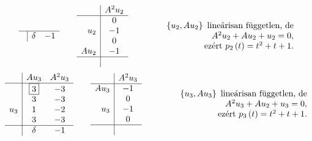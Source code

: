 \documentclass[9pt, a4paper, showtrims]{memoir}
\makeatletter
\renewenvironment{proof}[1][\proofname]
    {\par\pushQED{\qed}%
    \normalfont \topsep6\p@\@plus6\p@\relax
    \trivlist
    \item[\hskip\labelsep
        \itshape
    #1\@addpunct{:}]\ignorespaces}
    {\popQED\endtrivlist\@endpefalse}
\theoremstyle{plain}
\theoremstyle{remark}
\theoremstyle{definition}
\makeatother
\begin{document}
\begin{proof}[Megoldás]
\[\begin{array}{r|cc}
                \hline
                &\delta&-1
            \end{array}
            \qquad
            \begin{array}{r|c}
                &A^2u_2\\
                \hline
                & 0\\
                u_2&-1\\
                & 0\\
                Au_2&-1\\
                \hline
                & 
            \end{array}
            \qquad\qquad
            \begin{array}{r}
                \left\{ u_2,Au_2 \right\}\mbox{ lineárisan független, de}\\
                A^2u_2+Au_2+u_2=0,\\
                \mbox{ezért } p_2\left( t \right)=t^2+t+1.
            \end{array}
        \]
        \[
            \begin{array}{r|cc}
                &Au_3&A^2u_3\\
                \hline
                &\framebox{3}&-3\\
                &3&-3\\
                u_3&1&-2\\
                &3&-3\\
                \hline
                &\delta&-1
            \end{array}
            \qquad
            \begin{array}{r|c}
                &A^2u_3\\
                \hline
                Au_3&-1\\
                & 0\\
                u_3&-1\\
                &0\\
                \hline
                & 
            \end{array}
            \qquad\qquad
            \begin{array}{r}
                \left\{ u_3,Au_3 \right\}\mbox{ lineárisan független, de}\\
                A^2u_3+Au_2+u_3=0,\\
                \mbox{ezért } p_3\left( t \right)=t^2+t+1.
            \end{array}
        \]
        \[
\]
\end{proof}
\end{document}
